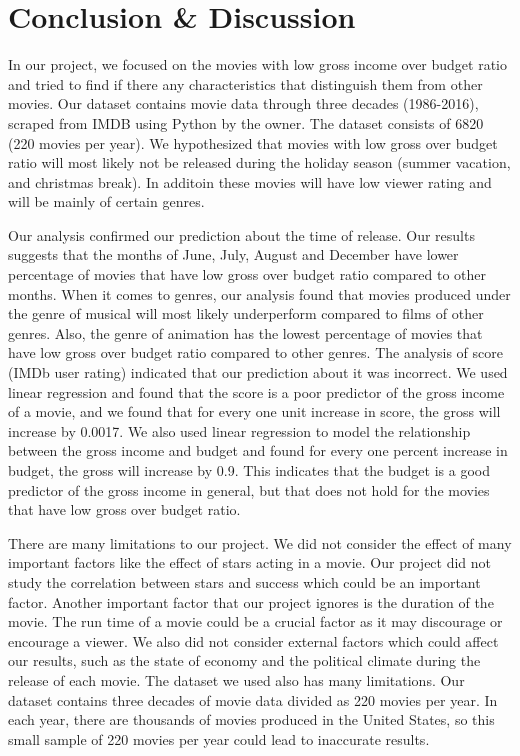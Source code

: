 \documentclass[11pt]{article}
\begin{document}
    \section{Conclusion \& Discussion}\label{conclusion-discussion}

    In our project, we focused on the movies with low gross income over
budget ratio and tried to find if there any characteristics that
distinguish them from other movies. Our dataset contains movie data
through three decades (1986-2016), scraped from IMDB using Python by the
owner. The dataset consists of 6820 (220 movies per year). We
hypothesized that movies with low gross over budget ratio will most
likely not be released during the holiday season (summer vacation, and
christmas break). In additoin these movies will have low viewer rating
and will be mainly of certain genres.

Our analysis confirmed our prediction about the time of release. Our
results suggests that the months of June, July, August and December have
lower percentage of movies that have low gross over budget ratio
compared to other months. When it comes to genres, our analysis found
that movies produced under the genre of musical will most likely
underperform compared to films of other genres. Also, the genre of
animation has the lowest percentage of movies that have low gross over
budget ratio compared to other genres. The analysis of score (IMDb user
rating) indicated that our prediction about it was incorrect. We used
linear regression and found that the score is a poor predictor of the
gross income of a movie, and we found that for every one unit increase
in score, the gross will increase by 0.0017. We also used linear
regression to model the relationship between the gross income and budget
and found for every one percent increase in budget, the gross will
increase by 0.9. This indicates that the budget is a good predictor of
the gross income in general, but that does not hold for the movies that
have low gross over budget ratio.

There are many limitations to our project. We did not consider the
effect of many important factors like the effect of stars acting in a
movie. Our project did not study the correlation between stars and
success which could be an important factor. Another important factor
that our project ignores is the duration of the movie. The run time of a
movie could be a crucial factor as it may discourage or encourage a
viewer. We also did not consider external factors which could affect our
results, such as the state of economy and the political climate during
the release of each movie. The dataset we used also has many
limitations. Our dataset contains three decades of movie data divided as
220 movies per year. In each year, there are thousands of movies
produced in the United States, so this small sample of 220 movies per
year could lead to inaccurate results.


    
    
    
    
\end{document}
